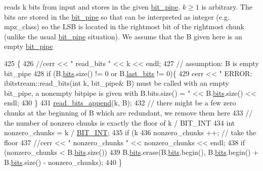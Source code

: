 reads k bits from input and stores in the given \hyperlink{classbit__pipe}{bit\+\_\+pipe}. $k \geq 1$ is arbitrary. The bits are stored in the \hyperlink{classbit__pipe}{bit\+\_\+pipe} so that can be interpreted as integer (e.\+g. mpz\+\_\+class) so the L\+SB is located in the rightmost bit of the rightmost chunk (unlike the usual \hyperlink{classbit__pipe}{bit\+\_\+pipe} situation). We assume that the B given here is an empty \hyperlink{classbit__pipe}{bit\+\_\+pipe} 


\begin{DoxyCode}
425                                             \{
426   \textcolor{comment}{//cerr << " read\_bits " << k << endl;}
427   \textcolor{comment}{// assumption: B is empty bit\_pipe}
428   \textcolor{keywordflow}{if} (B.\hyperlink{classbit__pipe_a86f38af1e9736b053728033490476b50}{bits}.size() != 0 or B.\hyperlink{classbit__pipe_a0f3e84b02751803adaab499b5dad86fe}{last\_bits} != 0)\{
429     cerr << \textcolor{stringliteral}{" ERROR: ibitstream::read\_bits(int k, bit\_pipe& B) must be called with an empty bit\_pipe, a
       nonempty bitpipe is given with B.bits.size() = "} << B.\hyperlink{classbit__pipe_a86f38af1e9736b053728033490476b50}{bits}.size() << endl;
430   \}
431   \hyperlink{classibitstream_acec2e9efa21551ce8db784f5b0bbd1b5}{read\_bits\_append}(k, B);
432   \textcolor{comment}{// there might be a few zero chunks at the beginning of B which are redundant, we remove them here}
433   \textcolor{comment}{// the number of nonzero chunks is exactly the floor of k / BIT\_INT}
434   \textcolor{keywordtype}{int} nonzero\_chunks = k / \hyperlink{bitstream_8h_afcadf5aa65c5159bfb96c4d82ebc0a5d}{BIT\_INT};
435   \textcolor{keywordflow}{if} (k %
436     nonzero\_chunks ++; \textcolor{comment}{// take the floor}
437   \textcolor{comment}{//cerr << " nonzero\_chunks " << nonzero\_chunks << endl;}
438   \textcolor{keywordflow}{if} (nonzero\_chunks < B.\hyperlink{classbit__pipe_a86f38af1e9736b053728033490476b50}{bits}.size())
439     B.\hyperlink{classbit__pipe_a86f38af1e9736b053728033490476b50}{bits}.erase(B.\hyperlink{classbit__pipe_a86f38af1e9736b053728033490476b50}{bits}.begin(), B.\hyperlink{classbit__pipe_a86f38af1e9736b053728033490476b50}{bits}.begin() + B.\hyperlink{classbit__pipe_a86f38af1e9736b053728033490476b50}{bits}.size() - nonzero\_chunks);
440 \}
\end{DoxyCode}
\mbox{\label{classibitstream_acec2e9efa21551ce8db784f5b0bbd1b5}} 
